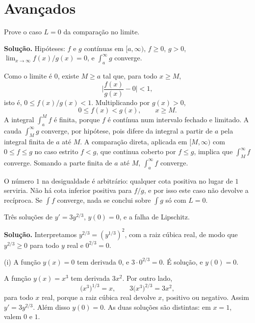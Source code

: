 \documentclass[11pt,a4paper]{article}
\begin{document}
\section{Avançados}

\begin{exercicio}[Avançado --- A1]
Prove o caso \(L=0\) da comparação no limite.
\end{exercicio}

\noindent\textbf{Solução.}
Hipóteses: \(f\) e \(g\) contínuas em \([a,\infty)\), \(f\ge 0\), \(g>0\), \(\lim_{x\to\infty} f(x)/g(x)=0\), e \(\int_a^{\infty} g\) converge.

Como o limite é \(0\), existe \(M\ge a\) tal que, para todo \(x\ge M\),
\[
\Biggl\lvert\frac{f(x)}{g(x)}-0\Biggr\rvert<1,
\]
isto é, \(0\le f(x)/g(x)<1\). Multiplicando por \(g(x)>0\),
\[
0\le f(x)<g(x),\qquad x\ge M.
\]
A integral \(\int_a^{M} f\) é finita, porque \(f\) é contínua num intervalo fechado e limitado. A cauda \(\int_M^{\infty} g\) converge, por hipótese, pois difere da integral a partir de \(a\) pela integral finita de \(a\) até \(M\). A comparação direta, aplicada em \([M,\infty)\) com \(0\le f\le g\) no caso estrito \(f<g\), que continua coberto por \(f\le g\), implica que \(\int_M^{\infty} f\) converge. Somando a parte finita de \(a\) até \(M\), \(\int_a^{\infty} f\) converge.

O número \(1\) na desigualdade é arbitrário: qualquer cota positiva no lugar de \(1\) serviria. Não há cota inferior positiva para \(f/g\), e por isso este caso não devolve a recíproca. Se \(\int f\) converge, nada se conclui sobre \(\int g\) só com \(L=0\).

\begin{exercicio}[Avançado --- A2]
Três soluções de \(y'=3y^{2/3}\), \(y(0)=0\), e a falha de Lipschitz.
\end{exercicio}

\noindent\textbf{Solução.}
Interpretamos \(y^{2/3}=(y^{1/3})^{2}\), com a raiz cúbica real, de modo que \(y^{2/3}\ge 0\) para todo \(y\) real e \(0^{2/3}=0\).

(i) A função \(y(x)=0\) tem derivada \(0\), e \(3\cdot 0^{2/3}=0\). É solução, e \(y(0)=0\).

A função \(y(x)=x^{3}\) tem derivada \(3x^{2}\). Por outro lado,
\[
\bigl(x^{3}\bigr)^{1/3}=x,\qquad
3\bigl(x^{3}\bigr)^{2/3}=3x^{2},
\]
para todo \(x\) real, porque a raiz cúbica real devolve \(x\), positivo ou negativo. Assim \(y'=3y^{2/3}\). Além disso \(y(0)=0\). As duas soluções são distintas: em \(x=1\), valem \(0\) e \(1\).
\end{document}
